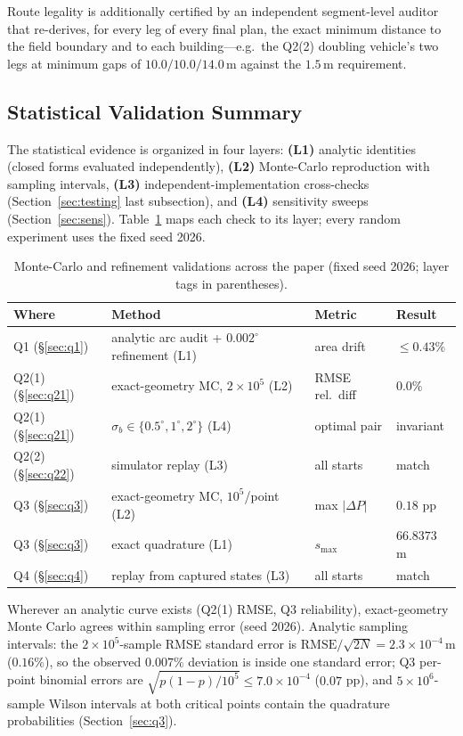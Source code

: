 Route legality is additionally certified by an independent segment-level auditor that
re-derives, for every leg of every final plan, the exact minimum distance to the field
boundary and to each building---e.g.\ the Q2(2) doubling vehicle's two legs at minimum
gaps of $10.0/10.0/14.0\,\mathrm{m}$ against the $1.5\,\mathrm{m}$ requirement.

\subsection{Statistical Validation Summary}

The statistical evidence is organized in four layers: \textbf{(L1)} analytic
identities (closed forms evaluated independently), \textbf{(L2)} Monte-Carlo
reproduction with sampling intervals, \textbf{(L3)} independent-implementation
cross-checks (Section~\ref{sec:testing} last subsection), and \textbf{(L4)} sensitivity
sweeps (Section~\ref{sec:sens}). Table~\ref{tab:mcsummary} maps each check to its
layer; every random experiment uses the fixed seed 2026.

\begin{table}[!htb]\centering\footnotesize
\caption{Monte-Carlo and refinement validations across the paper (fixed seed 2026;
layer tags in parentheses).}
\label{tab:mcsummary}
\begin{tabular}{llll}
\toprule
Where & Method & Metric & Result \\
\midrule
Q1 (\S\ref{sec:q1}) & analytic arc audit + $0.002^\circ$ refinement (L1) & area drift & $\le0.43\%$ \\
Q2(1) (\S\ref{sec:q21}) & exact-geometry MC, $2\times10^{5}$ (L2) & RMSE rel.\ diff & $0.0\%$ \\
Q2(1) (\S\ref{sec:q21}) & $\sigma_b\in\{0.5^\circ,1^\circ,2^\circ\}$ (L4) & optimal pair & invariant \\
Q2(2) (\S\ref{sec:q22}) & simulator replay (L3) & all starts & match \\
Q3 (\S\ref{sec:q3}) & exact-geometry MC, $10^{5}$/point (L2) & max $|\Delta P|$ & $0.18$ pp \\
Q3 (\S\ref{sec:q3}) & exact quadrature (L1) & $s_{\max}$ & $66.8373$ m \\
Q4 (\S\ref{sec:q4}) & replay from captured states (L3) & all starts & match \\
\bottomrule
\end{tabular}
\end{table}

Wherever an analytic curve exists (Q2(1) RMSE, Q3 reliability), exact-geometry Monte
Carlo agrees within sampling error (seed 2026). Analytic sampling intervals: the
$2\times10^{5}$-sample RMSE standard error is
$\mathrm{RMSE}/\sqrt{2N}=2.3\times10^{-4}\,\mathrm{m}$ ($0.16\%$), so the observed
$0.007\%$ deviation is inside one standard error; Q3 per-point binomial errors are
$\sqrt{p(1-p)/10^{5}}\le7.0\times10^{-4}$ ($0.07$ pp), and $5\times10^{6}$-sample Wilson
intervals at both critical points contain the quadrature probabilities
(Section~\ref{sec:q3}).

